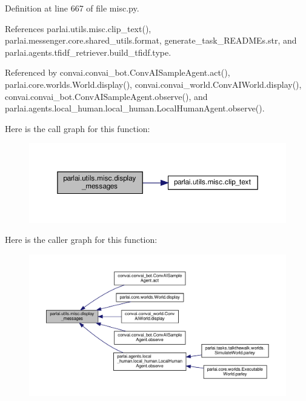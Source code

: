 Definition at line 667 of file misc.\+py.



References parlai.\+utils.\+misc.\+clip\+\_\+text(), parlai.\+messenger.\+core.\+shared\+\_\+utils.\+format, generate\+\_\+task\+\_\+\+R\+E\+A\+D\+M\+Es.\+str, and parlai.\+agents.\+tfidf\+\_\+retriever.\+build\+\_\+tfidf.\+type.



Referenced by convai.\+convai\+\_\+bot.\+Conv\+A\+I\+Sample\+Agent.\+act(), parlai.\+core.\+worlds.\+World.\+display(), convai.\+convai\+\_\+world.\+Conv\+A\+I\+World.\+display(), convai.\+convai\+\_\+bot.\+Conv\+A\+I\+Sample\+Agent.\+observe(), and parlai.\+agents.\+local\+\_\+human.\+local\+\_\+human.\+Local\+Human\+Agent.\+observe().

Here is the call graph for this function\+:
\nopagebreak
\begin{figure}[H]
\begin{center}
\leavevmode
\includegraphics[width=350pt]{namespaceparlai_1_1utils_1_1misc_a146f303a4c4b34993458968c74b55d2f_cgraph}
\end{center}
\end{figure}
Here is the caller graph for this function\+:
\nopagebreak
\begin{figure}[H]
\begin{center}
\leavevmode
\includegraphics[width=350pt]{namespaceparlai_1_1utils_1_1misc_a146f303a4c4b34993458968c74b55d2f_icgraph}
\end{center}
\end{figure}
\mbox{\label{namespaceparlai_1_1utils_1_1misc_a7836ac7469dc5744e0ad9e5e54da2396}} 
